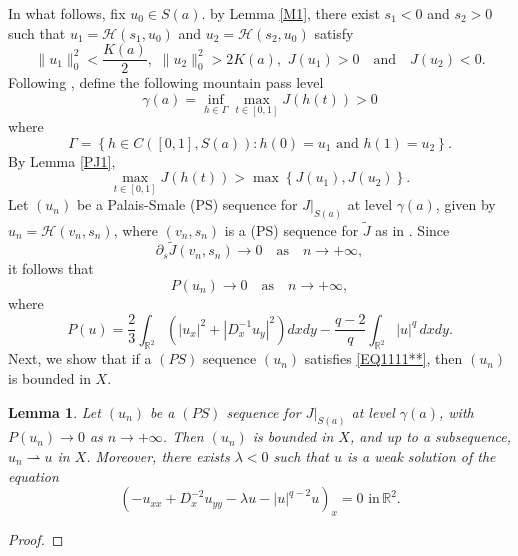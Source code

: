 \documentclass[11pt]{amsart}
\newtheorem{lemma}[theorem]{Lemma}
\numberwithin{equation}{section}
\begin{document}
{{{In what follows, {fix $u_0 \in S(a)$.  by Lemma \ref{M1}, there exist  $s_1<0$ and $s_2>0$ such that  $u_1=\mathcal{H}(s_1,u_0)$ and $u_2=\mathcal{H}(s_2,u_0)$ satisfy}
$$
\| u_1\|^2_0<\frac{K(a)}{2}, \,\, \| u_2\|^2_0>2K(a),\,\, J(u_1)>0\quad \mbox{and} \quad J(u_2)<0.
$$
Following  \cite{Jean}, define the following mountain pass level
$$
\gamma(a)=\inf_{h \in \Gamma}\max_{t \in [0,1]}J(h(t))>0
$$
where
$$
\Gamma=\left\{h \in C([0,1],S(a)): h(0)=u_1 \,\,\mbox{and} \,\, h(1)=u_2 \right\}.
$$
By Lemma \ref{PJ1},
$$
\max_{t \in [0,1]}J(h(t))>\max \left\{J(u_1),J(u_2)\right\}.
$$
{Let $(u_n)$ be a Palais-Smale (PS) sequence for $J|_{S(a)}$ at level $\gamma(a)$, given by $u_n = \mathcal{H}(v_n, s_n)$, where $(v_n, s_n)$ is a (PS) sequence for $\tilde{J}$ as in \cite[Proposition 2.2]{Jean}. Since}
$$
{\partial_s}\tilde{J}(v_n,s_n) \to 0 \quad \mbox{as} \quad n \to +\infty,
$$
it follows that
\begin{equation} \label{EQ1111**}
    P(u_n)\to 0 \quad \mbox{as} \quad n \to +\infty,
\end{equation}
where
\begin{equation} \label{EQ111**}
    P(u)=\frac{2}{3}\int_{\mathbb{R}^{2}}\left( |u_{x}|^{2} +|D^{-1}_{x} u_{y}|^{2}\right) dx dy-\frac{q-2}{q}\int_{\mathbb{R}^2} |u|^q \,dxdy.
\end{equation}
Next, we show that if a $ (PS) $ sequence $(u_n)$ satisfies \eqref{EQ1111**}, then $(u_n)$ is bounded in $X$.
\begin{lemma}\label{Bounded}
    Let $(u_n)$ be a $ (PS) $ sequence for $J|_{S(a)}$ at level $\gamma(a)$, with $P(u_n)\to0$ as $n\rightarrow +\infty$.
    Then $(u_n)$ is bounded in $X$, and up to a subsequence, $u_n \rightharpoonup u$ in $X$. Moreover, there exists $\lambda<0$ such that
    $u $ is a weak solution of the equation
    $$
    \left(-u_{x x}+D_x^{-2} u_{y y}-\lambda u-|u|^{q-2}u\right)_x=0 \,\,\text{in} \,\mathbb{R}^2.
    $$
\end{lemma}
\begin{proof}


\end{proof}}}}
\end{document}
